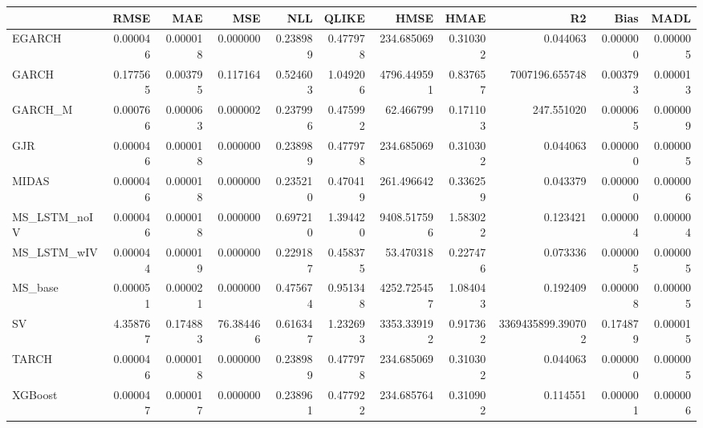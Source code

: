 \begin{tabular}{lrrrrrrrrrr}
\toprule
 & RMSE & MAE & MSE & NLL & QLIKE & HMSE & HMAE & R2 & Bias & MADL \\
\midrule
EGARCH & 0.000046 & 0.000018 & 0.000000 & 0.238989 & 0.477978 & 234.685069 & 0.310302 & 0.044063 & 0.000000 & 0.000005 \\
GARCH & 0.177565 & 0.003795 & 0.117164 & 0.524603 & 1.049206 & 4796.449591 & 0.837657 & 7007196.655748 & 0.003793 & 0.000013 \\
GARCH_M & 0.000766 & 0.000063 & 0.000002 & 0.237996 & 0.475992 & 62.466799 & 0.171103 & 247.551020 & 0.000065 & 0.000009 \\
GJR & 0.000046 & 0.000018 & 0.000000 & 0.238989 & 0.477978 & 234.685069 & 0.310302 & 0.044063 & 0.000000 & 0.000005 \\
MIDAS & 0.000046 & 0.000018 & 0.000000 & 0.235210 & 0.470419 & 261.496642 & 0.336259 & 0.043379 & 0.000000 & 0.000006 \\
MS_LSTM_noIV & 0.000046 & 0.000018 & 0.000000 & 0.697210 & 1.394420 & 9408.517596 & 1.583022 & 0.123421 & 0.000004 & 0.000004 \\
MS_LSTM_wIV & 0.000044 & 0.000019 & 0.000000 & 0.229187 & 0.458375 & 53.470318 & 0.227476 & 0.073336 & 0.000005 & 0.000005 \\
MS_base & 0.000051 & 0.000021 & 0.000000 & 0.475674 & 0.951348 & 4252.725457 & 1.084043 & 0.192409 & 0.000008 & 0.000005 \\
SV & 4.358767 & 0.174883 & 76.384466 & 0.616347 & 1.232693 & 3353.339192 & 0.917362 & 3369435899.390702 & 0.174879 & 0.000015 \\
TARCH & 0.000046 & 0.000018 & 0.000000 & 0.238989 & 0.477978 & 234.685069 & 0.310302 & 0.044063 & 0.000000 & 0.000005 \\
XGBoost & 0.000047 & 0.000017 & 0.000000 & 0.238961 & 0.477922 & 234.685764 & 0.310902 & 0.114551 & 0.000001 & 0.000006 \\
\bottomrule
\end{tabular}
